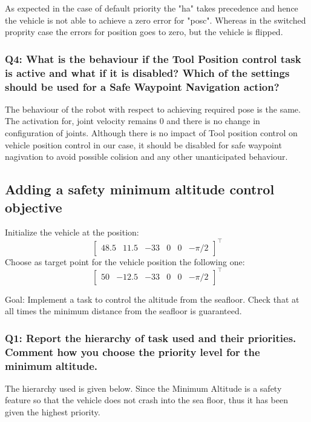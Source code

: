 \documentclass{article}
\begin{document}
As expected in the case of default priority the "ha" takes precedence and hence the vehicle is not able to achieve a zero error for "posc". Whereas in the switched proprity case the errors for position goes to zero, but the vehicle is flipped. 

\subsubsection{Q4: What is the behaviour if the Tool Position control task is active and what if it is disabled? Which of the settings should be used for a Safe Waypoint Navigation action?}

The behaviour of the robot with respect to achieving required pose is the same. The activation for, joint velocity remains 0 and there is no change in configuration of joints. Although there is no impact of Tool position control on vehicle position control in our case, it should be disabled for safe waypoint nagivation to avoid possible colision and any other unanticipated behaviour.


\subsection{Adding a safety minimum altitude control objective}
Initialize the vehicle at the position:
\begin{displaymath}
\begin{bmatrix} 48.5 & 11.5 & -33 & 0 & 0 &-\pi/2\end{bmatrix}^\top
\end{displaymath} 
Choose as target point for the vehicle position the following one:
\begin{displaymath}
\begin{bmatrix} 50 & -12.5 & -33 & 0 & 0 & -\pi/2 \end{bmatrix}^\top
\end{displaymath}

Goal: Implement a task to control the altitude from the seafloor. Check that at all times the minimum distance from the seafloor is guaranteed.


\subsubsection{Q1: Report the hierarchy of task used and their priorities. Comment how you choose the priority level for the minimum altitude.}

The hierarchy used is given below. Since the Minimum Altitude is a safety feature so that the vehicle does not crash into the sea floor, thus it has been given the highest priority. 
\end{document}
